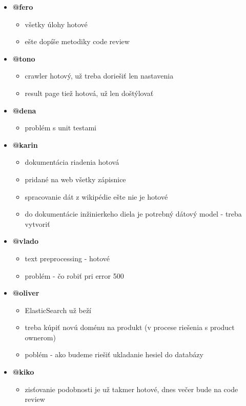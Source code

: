 \documentclass{article}
\begin{document}
    \begin{itemize}
        \item \textbf {@fero}
        \begin{itemize}
            \item všetky úlohy hotové
            \item ešte dopíše metodiky code review
        \end{itemize}
        \item \textbf {@tono}
        \begin{itemize}
            \item crawler hotový, už treba doriešiť len nastavenia
            \item result page tiež hotová, už len doštýlovať 
        \end{itemize}
        \item \textbf {@dena}
        \begin{itemize}
            \item problém s unit testami
        \end{itemize}
        \item \textbf {@karin}
        \begin{itemize}
            \item dokumentácia riadenia hotová
            \item pridané na web všetky zápisnice
            \item spracovanie dát z wikipédie ešte nie je hotové 
            \item do dokumentácie inžinierkeho diela je potrebný dátový model - treba vytvoriť 
        \end{itemize}
        \item \textbf {@vlado}
        \begin{itemize}
            \item text preprocessing - hotové
            \item problém - čo robiť pri error 500
        \end{itemize}
        \item \textbf {@oliver}
        \begin{itemize}
            \item ElasticSearch už beží
            \item treba kúpiť novú doménu na produkt (v procese riešenia s product ownerom)
            \item poblém - ako budeme riešiť ukladanie hesiel do databázy
        \end{itemize}
        \item \textbf {@kiko}
        \begin{itemize}
            \item zisťovanie podobnosti je už takmer hotové, dnes večer bude na code review
        \end{itemize}
    \end{itemize}    
\end{document}
